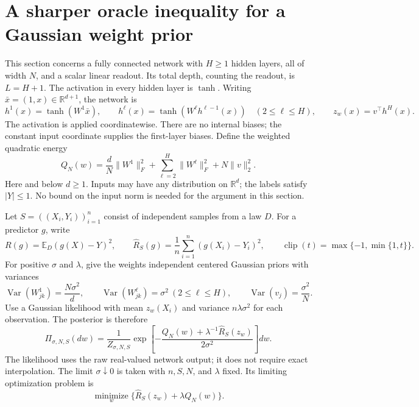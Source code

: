 \section{A sharper oracle inequality for a Gaussian weight prior}
\label{sec:gaussian-oracle}

This section concerns a fully connected network with $H\geq1$ hidden
layers, all of width $N$, and a scalar linear readout.  Its total depth,
counting the readout, is $L=H+1$.  The activation in every hidden layer is
$\tanh$.  Writing $\bar x=(1,x)\in\mathbb R^{d+1}$, the network is
\[
 h^1(x)=\tanh(W^1\bar x),\qquad
 h^\ell(x)=\tanh(W^\ell h^{\ell-1}(x))\quad(2\leq\ell\leq H),
 \qquad z_w(x)=v^\top h^H(x).
\]
The activation is applied coordinatewise.  There are no internal biases;
the constant input coordinate supplies the first-layer biases.  Define
the weighted quadratic energy
\begin{equation}
 Q_N(w)=\frac dN\|W^1\|_F^2+
       \sum_{\ell=2}^H\|W^\ell\|_F^2+N\|v\|_2^2.
 \label{eq:gaussian-energy}
\end{equation}
Here and below $d\geq1$.  Inputs may have any distribution on
$\mathbb R^d$; the labels satisfy $|Y|\leq1$.  No bound on the input norm
is needed for the argument in this section.

Let $S=((X_i,Y_i))_{i=1}^n$ consist of independent samples from a law $D$.
For a predictor $g$, write
\[
 R(g)=\mathbb E_D(g(X)-Y)^2,\qquad
 \widehat R_S(g)=\frac1n\sum_{i=1}^n(g(X_i)-Y_i)^2,
 \qquad \operatorname{clip}(t)=\max\{-1,\min\{1,t\}\}.
\]
For positive $\sigma$ and $\lambda$, give the weights independent
centered Gaussian priors with variances
\begin{equation}
 \operatorname{Var}(W^1_{jk})=\frac{N\sigma^2}{d},\qquad
 \operatorname{Var}(W^\ell_{jk})=\sigma^2\ (2\leq\ell\leq H),\qquad
 \operatorname{Var}(v_j)=\frac{\sigma^2}{N}.
 \label{eq:gaussian-prior-variances}
\end{equation}
Use a Gaussian likelihood with mean $z_w(X_i)$ and variance
$n\lambda\sigma^2$ for each observation.  The posterior is therefore
\begin{equation}
 \Pi_{\sigma,N,S}(dw)=\frac1{Z_{\sigma,N,S}}
  \exp\left[-\frac{Q_N(w)+\lambda^{-1}\widehat R_S(z_w)}{2\sigma^2}\right]dw.
 \label{eq:gaussian-posterior}
\end{equation}
The likelihood uses the raw real-valued network output; it does not
require exact interpolation.  The limit $\sigma\downarrow0$ is taken
with $n,S,N$, and $\lambda$ fixed.  Its limiting optimization problem is
\begin{equation}
 \operatorname*{minimize}_w
 \bigl\{\widehat R_S(z_w)+\lambda Q_N(w)\bigr\}.
 \label{eq:gaussian-objective}
\end{equation}

